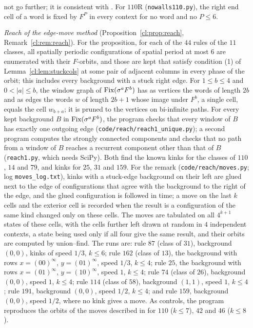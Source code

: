 not go further; it is consistent with \cite{Takesue1997}. For $110$R (\texttt{nowalls110.py}), the right end cell of a word is fixed by $F^P$ in every context for no word and no $P\le6$.

\emph{Reach of the edge-move method} (Proposition~\ref{cl:prop:reach}, Remark~\ref{cl:rem:reach}).\label{app:reach} For the proposition, for each of the $44$ rules of the $11$ classes, all spatially periodic configurations of spatial period at most $6$ are enumerated with their $F$-orbits, and those are kept that satisfy condition (1) of Lemma~\ref{cl:lem:stuckcols} at some pair of adjacent columns in every phase of the orbit; this includes every background with a stuck right edge. For $1\le b\le4$ and $0<|a|\le b$, the window graph of $\mathrm{Fix}(\sigma^aF^b)$ has as vertices the words of length $2b$ and as edges the words $w$ of length $2b+1$ whose image under $F^b$, a single cell, equals the cell $w_{b+a}$; it is pruned to the vertices on bi-infinite paths. For every kept background $B$ in $\mathrm{Fix}(\sigma^aF^b)$, the program checks that every window of $B$ has exactly one outgoing edge (\texttt{code/reach/reach1\_unique.py}); a second program computes the strongly connected components and checks that no path from a window of $B$ reaches a recurrent component other than that of $B$ (\texttt{reach1.py}, which needs SciPy). Both find the known kinks for the classes of $110$, $14$ and $79$, and kinks for $25$, $31$ and $159$. For the remark (\texttt{code/reach/moves.py}; log \texttt{moves\_log.txt}), kinks with a stuck-edge background on their left are glued next to the edge of configurations that agree with the background to the right of the edge, and the glued configuration is followed in time; a move on the last $k$ cells and the exterior cell is recorded when the result is a configuration of the same kind changed only on these cells. The moves are tabulated on all $4^{k+1}$ states of these cells, with the cells further left drawn at random in $4$ independent contexts, a state being used only if all four give the same result, and their orbits are computed by union--find. The runs are: rule $87$ (class of $31$), background $(0,0)$, kinks of speed $1/3$, $k\le6$; rule $162$ (class of $13$), the background with rows $x=(00)^\infty$, $y=(01)^\infty$, speed $1/3$, $k\le4$; rule $25$, the background with rows $x=(01)^\infty$, $y=(10)^\infty$, speed $1$, $k\le4$; rule $74$ (class of $26$), background $(0,0)$, speed $1$, $k\le4$; rule $114$ (class of $58$), background $(1,1)$, speed $1$, $k\le4$; rule $191$, background $(0,0)$, speed $1/2$, $k\le4$; and rule $159$, background $(0,0)$, speed $1/2$, where no kink gives a move. As controls, the program reproduces the orbits of the moves described in \cite{PaperA} for $110$ ($k\le7$), $42$ and $46$ ($k\le8$).

